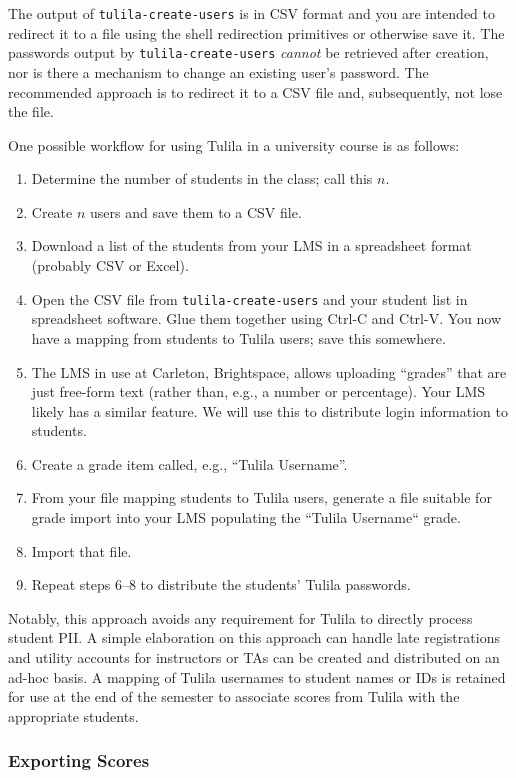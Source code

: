 \documentclass[12pt]{article}
\begin{document}
The output of \texttt{tulila-create-users} is in CSV format and you are intended to redirect it to a file using the shell redirection primitives or otherwise save it. The passwords output by \texttt{tulila-create-users} \textit{cannot} be retrieved after creation, nor is there a mechanism to change an existing user's password. The recommended approach is to redirect it to a CSV file and, subsequently, not lose the file.

One possible workflow for using Tulila in a university course is as follows:
\begin{enumerate}
  \item Determine the number of students in the class; call this $n$.
  \item Create $n$ users and save them to a CSV file.
  \item Download a list of the students from your LMS in a spreadsheet format (probably CSV or Excel).
  \item Open the CSV file from \texttt{tulila-create-users} and your student list in spreadsheet software. Glue them together using Ctrl-C and Ctrl-V. You now have a mapping from students to Tulila users; save this somewhere.
  \item The LMS in use at Carleton, Brightspace, allows uploading ``grades'' that are just free-form text (rather than, e.g., a number or percentage). Your LMS likely has a similar feature. We will use this to distribute login information to students.
  \item Create a grade item called, e.g., ``Tulila Username''.
  \item From your file mapping students to Tulila users, generate a file suitable for grade import into your LMS populating the ``Tulila Username`` grade.
  \item Import that file.
  \item Repeat steps 6--8 to distribute the students' Tulila passwords.
\end{enumerate}

Notably, this approach avoids any requirement for Tulila to directly process student PII. A simple elaboration on this approach can handle late registrations and utility accounts for instructors or TAs can be created and distributed on an ad-hoc basis. A mapping of Tulila usernames to student names or IDs is retained for use at the end of the semester to associate scores from Tulila with the appropriate students.

\subsubsection{Exporting Scores}
\end{document}
